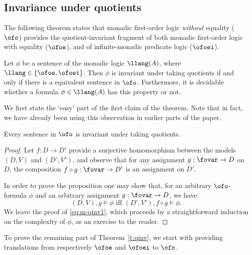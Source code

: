 \clearpage



\subsection{Invariance under quotients}

The following theorem states that monadic first-order logic \emph{without}
equality ($\ofo$) provides the quotient-invariant fragment of both monadic 
first-order logic with equality ($\ofoe$), and of infinite-monadic predicate 
logic ($\ofoei$).

\begin{theorem}
\label{t:qinv}
Let $\phi$ be a sentence of the monadic logic $\llang(A)$, where $\llang \in 
\{ \ofoe, \ofoei \}$.
Then $\phi$ is invariant under taking quotients if and only if there is a 
equivalent sentence
in $\ofo$.
Furthermore, it is decidable whether a formula $\phi \in \llang(A)$ has this 
property or not.
\end{theorem}

We first state the `easy' part of the first claim of the theorem. 
Note that in fact, we have already been using this observation in earlier parts
of the paper.

\begin{proposition}
\label{p:m-qinv}
Every sentence in $\ofo$ is invariant under taking quotients.
\end{proposition}

\begin{proof}
Let $f: D \to D'$ provide a surjective homomorphism between the models $(D,V)$ 
and $(D',V')$, and 
observe that for any assignment $g: \fovar \to D$ on $D$, the composition $f 
\circ g: \fovar \to D'$ is an assignment on $D'$.

In order to prove the proposition one may show that, for an arbitrary 
$\ofo$-formula $\phi$ and an arbitrary assignment $g: \fovar \to D$, we have
\begin{equation}
\label{eq:m-qinv1}
(D,V),g \models \phi \text{ iff } (D',V'), f \circ g \models \phi.
\end{equation}
We leave the proof of \eqref{eq:m-qinv1}, which proceeds by a straightforward 
induction on the complexity of $\phi$, as an exercise to the reader.
\end{proof}

To prove the remaining part of Theorem~\ref{t:qinv}, we start with providing 
translations from respectively $\ofoe$ and $\ofoei$ to $\ofo$.

